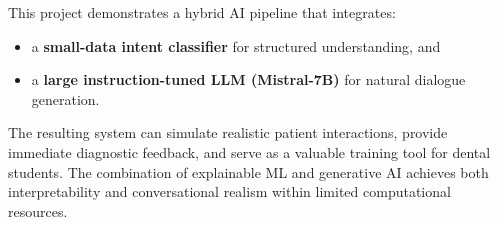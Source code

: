 This project demonstrates a hybrid AI pipeline that integrates:
\begin{itemize}
    \item a \textbf{small-data intent classifier} for structured understanding, and
    \item a \textbf{large instruction-tuned LLM (Mistral-7B)} for natural dialogue generation.
\end{itemize}

The resulting system can simulate realistic patient interactions, provide immediate diagnostic feedback, and serve as a valuable training tool for dental students. The combination of explainable ML and generative AI achieves both interpretability and conversational realism within limited computational resources.











